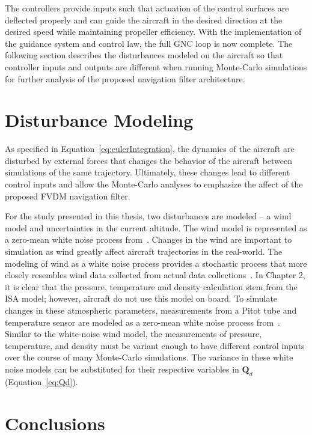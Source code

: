 The controllers provide inputs such that actuation of the control surfaces are deflected properly and can guide the aircraft in the desired direction at the desired speed while maintaining propeller efficiency. With the implementation of the guidance system and control law, the full GNC loop is now complete. The following section describes the disturbances modeled on the aircraft so that controller inputs and outputs are different when running Monte-Carlo simulations for further analysis of the proposed navigation filter architecture.

\section{Disturbance Modeling}

As specified in Equation~\ref{eq:eulerIntegration}, the dynamics of the aircraft are disturbed by external forces that changes the behavior of the aircraft between simulations of the same trajectory. Ultimately, these changes lead to different control inputs and allow the Monte-Carlo analyses to emphasize the affect of the proposed FVDM navigation filter.

For the study presented in this thesis, two disturbances are modeled {--} a wind model and uncertainties in the current altitude. The wind model is represented as a zero-mean white noise process from~\cite{khaghaniAutonomousVehicleDynamic2016}. Changes in the wind are important to simulation as wind greatly affect aircraft trajectories in the real-world. The modeling of wind as a white noise process provides a stochastic process that more closely resembles wind data collected from actual data collections~\cite{mwenegohaModelbasedTightlyCoupled2020}. In Chapter 2, it is clear that the pressure, temperature and density calculation stem from the ISA model; however, aircraft do not use this model on board. To simulate changes in these atmospheric parameters, measurements from a Pitot tube and temperature sensor are modeled as a zero-mean white noise process from~\cite{pieniazekDynamicResponsePitot2023}. Similar to the white-noise wind model, the measurements of pressure, temperature, and density must be variant enough to have different control inputs over the course of many Monte-Carlo simulations. The variance in these white noise models can be substituted for their respective variables in \(\mathbf{Q}_d\) (Equation~\ref{eq:Qd}).

\section{Conclusions}

